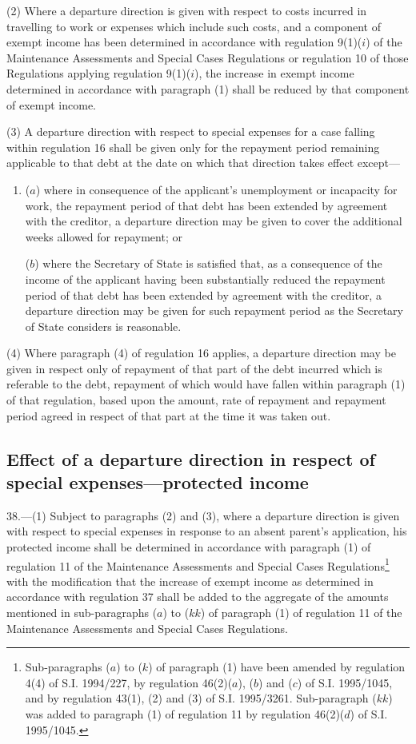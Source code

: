 \documentclass[a4paper]{article}
\begin{document}
(2) Where a departure direction is given with respect to costs incurred in
travelling to work or expenses which include such costs, and a component of
exempt income has been determined in accordance with regulation 9(1)($i$) of the
Maintenance Assessments and Special Cases Regulations or regulation 10 of those
Regulations applying regulation 9(1)($i$), the increase in exempt income
determined in accordance with paragraph (1) shall be reduced by that component
of exempt income.

(3) A departure direction with respect to special expenses for a case falling
within regulation 16 shall be given only for the repayment period remaining
applicable to that debt at the date on which that direction takes effect except—
\begin{enumerate}\item[]
($a$) where in consequence of the applicant’s unemployment or incapacity for work,
the repayment period of that debt has been extended by agreement with the
creditor, a departure direction may be given to cover the additional weeks
allowed for repayment; or

($b$) where the Secretary of State is satisfied that, as a consequence of the
income of the applicant having been substantially reduced the repayment period
of that debt has been extended by agreement with the creditor, a departure
direction may be given for such repayment period as the Secretary of State
considers is reasonable.
\end{enumerate}

(4) Where paragraph (4) of regulation 16 applies, a departure direction may be
given in respect only of repayment of that part of the debt incurred which is
referable to the debt, repayment of which would have fallen within paragraph (1)
of that regulation, based upon the amount, rate of repayment and repayment
period agreed in respect of that part at the time it was taken out.

\subsection[38. Effect of a departure direction in respect of special expenses—protected
income]{Effect of a departure direction in respect of special expenses—protected
income}

38.—(1) Subject to paragraphs (2) and (3), where a departure direction is
given with respect to special expenses in response to an absent parent’s
application, his protected income shall be determined in accordance with
paragraph (1) of regulation 11 of the Maintenance Assessments and Special Cases
Regulations\footnote{\frenchspacing Sub-paragraphs ($a$) to ($k$) of paragraph (1) have been amended by regulation 4(4) of S.I. 1994/227, by regulation 46(2)($a$), ($b$) and ($c$) of S.I. 1995/1045, and by regulation 43(1), (2) and (3) of S.I. 1995/3261. Sub-paragraph ($kk$) was added to paragraph (1) of regulation 11 by regulation 46(2)($d$) of S.I. 1995/1045.} with the modification that the increase of exempt income as
determined in accordance with regulation 37 shall be added to the aggregate of
the amounts mentioned in sub-paragraphs ($a$) to ($kk$) of paragraph (1) of
regulation 11 of the Maintenance Assessments and Special Cases Regulations.
\end{document}
